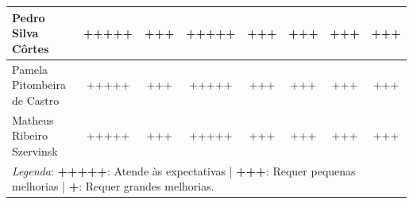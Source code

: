 \begin{landscape}
\begin{table}[htpb]
\begin{tabular}{|l|c|c|c|c|c|c|c|}
Pedro Silva Côrtes & +++++ & +++ &  +++++ & +++ & +++ & +++ & +++  \\ \hline
Pamela Pitombeira de Castro & +++++ & +++ &  +++++ & +++ & +++ & +++ & +++  \\ \hline
Matheus Ribeiro Szervinsk & +++++ & +++ &  +++++ & +++ & +++ & +++ & +++  \\ \hline
\multicolumn{8}{|l|}{\footnotesize \textit{Legenda}: \textbf{+++++}: Atende às expectativas | \textbf{+++}: Requer pequenas melhorias | \textbf{+}: Requer grandes melhorias.} \\ \hline
\end{tabular}
\end{table}

\end{landscape}
